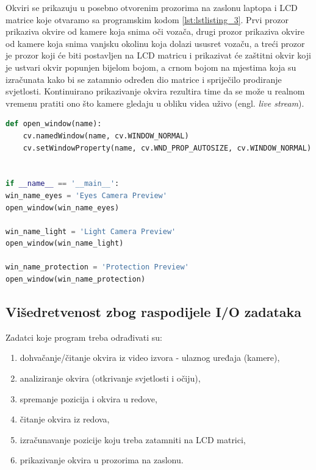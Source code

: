 \documentclass{foi}
\begin{document}
Okviri se prikazuju u posebno otvorenim prozorima na zaslonu laptopa i LCD matrice koje otvaramo sa programskim kodom \ref{lst:lstlisting_3}. Prvi prozor prikaziva okvire od kamere koja snima oči vozača, drugi prozor prikaziva okvire od kamere koja snima vanjsku okolinu koja dolazi ususret vozaču, a treći prozor je prozor koji će biti postavljen na LCD matricu i prikazivat će zaštitni okvir koji je ustvari okvir popunjen bijelom bojom, a crnom bojom na mjestima koja su izračunata kako bi se zatamnio određen dio matrice i spriječilo prodiranje svjetlosti. Kontinuirano prikazivanje okvira rezultira time da se može u realnom vremenu pratiti ono što kamere gledaju u obliku videa uživo (engl. \emph{live stream}).

\begin{lstlisting}[language=Python, label={lst:lstlisting_3}, firstnumber=142, style=colored, caption=Otvaranje prozora na zaslonu]
def open_window(name):
    cv.namedWindow(name, cv.WINDOW_NORMAL)
    cv.setWindowProperty(name, cv.WND_PROP_AUTOSIZE, cv.WINDOW_NORMAL)


if __name__ == '__main__':
win_name_eyes = 'Eyes Camera Preview'
open_window(win_name_eyes)

win_name_light = 'Light Camera Preview'
open_window(win_name_light)

win_name_protection = 'Protection Preview'
open_window(win_name_protection)
\end{lstlisting}

\subsection{Višedretvenost zbog raspodijele I/O zadataka}

\flushleft Zadatci koje program treba odrađivati su:
\begin{enumerate}[noitemsep]
    \item dohvačanje/čitanje okvira iz video izvora - ulaznog uređaja (kamere),
    \item analiziranje okvira (otkrivanje svjetlosti i očiju),
    \item spremanje pozicija i okvira u redove,
    \item čitanje okvira iz redova,
    \item izračunavanje pozicije koju treba zatamniti na LCD matrici,
    \item prikazivanje okvira u prozorima na zaslonu.
\end{enumerate}

\justifying
\end{document}
